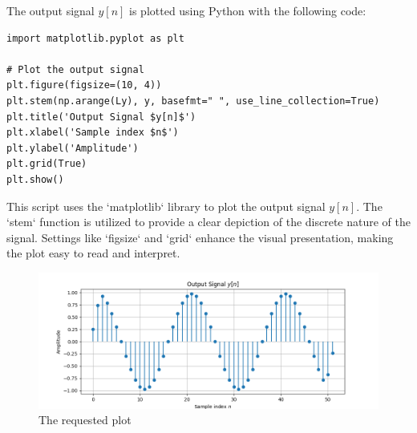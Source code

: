 
\item[(c)]
The output signal $y[n]$ is plotted using Python with the following code:

\begin{verbatim}
import matplotlib.pyplot as plt

# Plot the output signal
plt.figure(figsize=(10, 4))
plt.stem(np.arange(Ly), y, basefmt=" ", use_line_collection=True)
plt.title('Output Signal $y[n]$')
plt.xlabel('Sample index $n$')
plt.ylabel('Amplitude')
plt.grid(True)
plt.show()
\end{verbatim}

This script uses the `matplotlib` library to plot the output signal $y[n]$.
The `stem` function is utilized to provide a clear depiction of the discrete nature of the signal.
Settings like `figsize` and `grid` enhance the visual presentation, making the plot easy to read and interpret.

\begin{figure}[h]
\centering
\includegraphics[width=\textwidth]{fig/ex3_plot_1}
\caption{The requested plot}
\label{fig:ex3_plot}
\end{figure}


